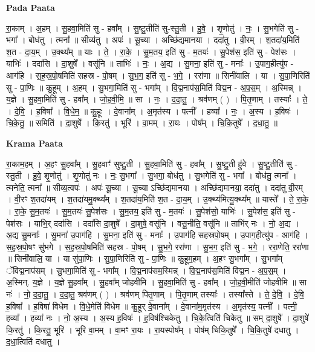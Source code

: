 \documentclass[17pt]{extarticle}
\begin{document}
\textbf{Pada Paata} \newline

रा॒काम् । अ॒हम् । सु॒हवा॒मिति॑ सु - हवा᳚म् । सु॒ष्टु॒तीति॑ सु-स्तु॒ती । हु॒वे॒ । शृ॒णोतु॑ । नः॒ । सु॒भगेति॑ सु - भगा᳚ । बोध॑तु । त्मना᳚ ॥ सीव्य॑तु । अपः॑ । सू॒च्या । अच्छि॑द्यमानया । ददा॑तु । वी॒रम् । श॒तदा॑य॒मिति॑ श॒त - दा॒य॒म् । उ॒क्थ्य᳚म् ॥ याः । ते॒ । रा॒के॒ । सु॒म॒तय॒ इति॑ सु - म॒तयः॑ । सु॒पेश॑स॒ इति॑ सु - पेश॑सः । याभिः॑ । ददा॑सि । दा॒शुषे᳚ । वसू॑नि ॥ ताभिः॑ । नः॒ । अ॒द्य । सु॒मना॒ इति॑ सु - मनाः᳚ । उ॒पाग॒हीत्यु॑प - आग॑हि । स॒ह॒स्र॒पो॒षमिति॑ सहस्र - पो॒षम् । सु॒भ॒ग॒ इति॑ सु - भ॒गे॒ । ररा॑णा ॥ सिनी॑वालि । या । सु॒पा॒णिरिति॑ सु - पा॒णिः ॥ कु॒हूम् । अ॒हम् । सु॒भगा॒मिति॑ सु - भगा᳚म् । वि॒द्म॒नाप॑स॒मिति॑ विद्म॒न - अ॒प॒स॒म् । अ॒स्मिन्न् । य॒ज्ञे । सु॒हवा॒मिति॑ सु - हवा᳚म् । जो॒ह॒वी॒मि॒ ॥ सा । नः॒ । द॒दा॒तु॒ । श्रव॑णम् ( ) । पि॒तृ॒णाम् । तस्याः᳚ । ते॒ । दे॒वि॒ । ह॒विषा᳚ । वि॒धे॒म॒ ॥ कु॒हूः । दे॒वाना᳚म् । अ॒मृत॑स्य । पत्नी᳚ । हव्या᳚ । नः॒ । अ॒स्य । ह॒विषः॑ । चि॒के॒तु॒ ॥ समिति॑ । दा॒शुषे᳚ । कि॒रतु॑ । भूरि॑ । वा॒मम् । रा॒यः । पोष᳚म् । चि॒कि॒तुषे᳚ । द॒धा॒तु॒ ॥  \newline


\textbf{Krama Paata} \newline

रा॒काम॒हम् । अ॒हꣳ सु॒हवा᳚म् । सु॒हवाꣳ॑ सुष्टु॒ती । सु॒हवा॒मिति॑ सु - हवा᳚म् । सु॒ष्टु॒ती हु॑वे । सु॒ष्टु॒तीति॑ सु - स्तु॒ती । हु॒वे॒ शृ॒णोतु॑ । शृ॒णोतु॑ नः । नः॒ सु॒भगा᳚ । सु॒भगा॒ बोध॑तु । सु॒भगेति॑ सु - भगा᳚ । बोध॑तु॒ त्मना᳚ । त्मनेति॒ त्मना᳚ ॥ सीव्य॒त्वपः॑ । अपः॑ सू॒च्या । सू॒च्या ऽच्छि॑द्यमानया । अच्छि॑द्यमानया॒ ददा॑तु । ददा॑तु वी॒रम् । वी॒रꣳ श॒तदा॑यम् । श॒तदा॑यमु॒क्थ्य᳚म् । श॒तदा॑य॒मिति॑ श॒त - दा॒य॒म् । उ॒क्थ्य॑मित्यु॒क्थ्य᳚म् ॥ यास्ते᳚ । ते॒ रा॒के॒ । रा॒के॒ सु॒म॒तयः॑ । सु॒म॒तयः॑ सु॒पेश॑सः । सु॒म॒तय॒ इति॑ सु - म॒तयः॑ । सु॒पेश॑सो॒ याभिः॑ । सु॒पेश॑स॒ इति॑ सु - पेश॑सः । याभि॒र् ददा॑सि । ददा॑सि दा॒शुषे᳚ । दा॒शुषे॒ वसू॑नि । वसू॒नीति॒ वसू॑नि ॥ ताभि॑र् नः । नो॒ अ॒द्य । अ॒द्य सु॒मनाः᳚ । सु॒मना॑ उ॒पाग॑हि । सु॒मना॒ इति॑ सु - मनाः᳚ । उ॒पाग॑हि सहस्रपो॒षम् । उ॒पाग॒हीत्यु॑प - आग॑हि । स॒ह॒स्र॒पो॒षꣳ सु॑भगे । स॒ह॒स्र॒पो॒षमिति॑ सहस्र - पो॒षम् । सु॒भ॒गे॒ ररा॑णा । सु॒भ॒ग॒ इति॑ सु - भ॒गे॒ । ररा॒णेति॒ ररा॑णा ॥ सिनी॑वालि॒ या । या सु॑पा॒णिः । सु॒पा॒णिरिति॑ सु - पा॒णिः ॥ कु॒हूम॒हम् । अ॒हꣳ सु॒भगा᳚म् । सु॒भगा᳚म् ॅविद्म॒नाप॑सम् । सु॒भगा॒मिति॑ सु - भगा᳚म् । वि॒द्म॒नाप॑सम॒स्मिन्न् । वि॒द्म॒नाप॑स॒मिति॑ विद्म॒न - अ॒प॒स॒म् । अ॒स्मिन्. य॒ज्ञे । य॒ज्ञे सु॒हवा᳚म् । सु॒हवा᳚म् जोहवीमि । सु॒हवा॒मिति॑ सु - हवा᳚म् । जो॒ह॒वी॒मीति॑ जोहवीमि ॥ सा नः॑ । नो॒ द॒दा॒तु॒ । द॒दा॒तु॒ श्रव॑णम् ( ) । श्रव॑णम् पितृ॒णाम् । पि॒तृ॒णाम् तस्याः᳚ । तस्या᳚स्ते । ते॒ दे॒वि॒ । दे॒वि॒ ह॒विषा᳚ । ह॒विषा॑ विधेम । वि॒धे॒मेति॑ विधेम ॥ 
कु॒हूर् दे॒वाना᳚म् । दे॒वाना॑म॒मृत॑स्य । अ॒मृत॑स्य॒ पत्नी᳚ । पत्नी॒ हव्या᳚ । हव्या॑ नः । नो॒ अ॒स्य । अ॒स्य ह॒विषः॑ । ह॒विष॑श्चिकेतु । चि॒के॒त्विति॑ चिकेतु ॥ सम् दा॒शुषे᳚ । दा॒शुषे॑ कि॒रतु॑ । कि॒रतु॒ भूरि॑ । भूरि॑ वा॒मम् । वा॒मꣳ रा॒यः । रा॒यस्पोष᳚म् । पोष॑म् चिकि॒तुषे᳚ । चि॒कि॒तुषे॑ दधातु । द॒धा॒त्विति॑ दधातु । \newline
\end{document}
